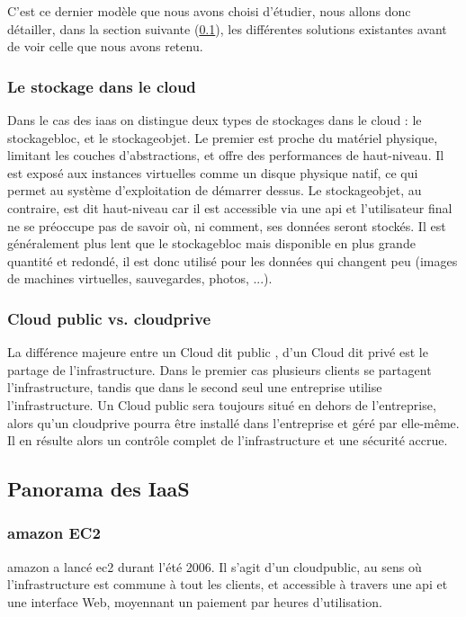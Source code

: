 \documentclass[a4paper,oneside]{report}
\begin{document}
C'est ce dernier modèle que nous avons choisi d'étudier, nous allons donc détailler, dans la section suivante (\ref{sec:panorama_iaas}), les différentes solutions existantes avant de voir celle que nous avons retenu.

\subsubsection{Le stockage dans le cloud}
Dans le cas des \gls{iaas} on distingue deux types de stockages dans le cloud : le \gls{stockagebloc}, et le \gls{stockageobjet}.
Le premier est proche du matériel physique, limitant les couches d'abstractions, et offre des performances de haut-niveau.
Il est exposé aux instances virtuelles comme un disque physique natif, ce qui permet au système d'exploitation de démarrer dessus.\newline
Le \gls{stockageobjet}, au contraire, est dit \og haut-niveau \fg car il est accessible via une \gls{api} et l'utilisateur final ne se préoccupe pas de savoir où, ni comment, ses données seront stockés.
Il est généralement plus lent que le \gls{stockagebloc} mais disponible en plus grande quantité et redondé, il est donc utilisé pour les données qui changent peu (images de machines virtuelles, sauvegardes, photos, ...).

\subsubsection{Cloud public vs. \gls{cloudprive}}
La différence majeure entre un Cloud dit \og public \fg, d'un Cloud dit \og privé \fg est le partage de l'infrastructure.
Dans le premier cas plusieurs clients se partagent l'infrastructure, tandis que dans le second seul une entreprise utilise l'infrastructure.\newline
Un Cloud public sera toujours situé en dehors de l'entreprise, alors qu'un \gls{cloudprive} pourra être installé dans l'entreprise et géré par elle-même.
Il en résulte alors un contrôle complet de l'infrastructure et une sécurité accrue.

\subsection{Panorama des IaaS} \label{sec:panorama_iaas}
\subsubsection{\gls{amazon} EC2}
\gls{amazon} a lancé \gls{ec2} durant l'été 2006.
Il s'agit d'un \gls{cloudpublic}, au sens où l'infrastructure est commune à tout les clients, et accessible à travers une \gls{api} et une interface Web, moyennant un paiement par heures d'utilisation.
\end{document}
